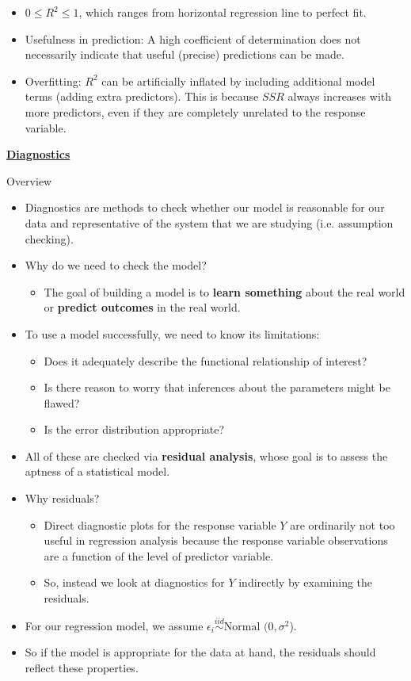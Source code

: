 \documentclass{article}
\newcommand{\bu}[1]{\textbf{\ul{#1}}}				%
\newcommand{\followsp}[2]{\overset{#1}\sim \text{#2}\,}		%
\begin{document}
\begin{itemize}
\begin{itemize}
\begin{itemize}
            \item $0 \le R^2 \le 1$, which ranges from horizontal regression line to perfect fit.
            \item Usefulness in prediction: A high coefficient of determination does not necessarily indicate that useful (precise) predictions can be made.
            \item Overfitting: $R^2$ can be artificially inflated by including additional model terms (adding extra predictors). This is because $SSR$ always increases with more predictors, even if they are completely unrelated to the response variable.
        \end{itemize}
    \end{itemize}
\end{itemize}\bigskip

\bu{Diagnostics}\bigskip

Overview\bigskip
\begin{itemize}
    \item Diagnostics are methods to check whether our model is reasonable for our data and representative of the system that we are studying (i.e. assumption checking).
    \item Why do we need to check the model?
    \begin{itemize}
        \item The goal of building a model is to \textbf{learn something} about the real world or \textbf{predict outcomes} in the real world.
    \end{itemize}
    \item To use a model successfully, we need to know its limitations:
    \begin{itemize}
        \item Does it adequately describe the functional relationship of interest?
        \item Is there reason to worry that inferences about the parameters might be flawed?
        \item Is the error distribution appropriate?
    \end{itemize}
    \item All of these are checked via \textbf{residual analysis}, whose goal is to assess the aptness of a statistical model.
    \item Why residuals? 
    \begin{itemize}
        \item Direct diagnostic plots for the response variable $Y$ are ordinarily not too useful in regression analysis because the response variable observations are a function of the level of predictor variable.
        \item So, instead we look at diagnostics for $Y$ indirectly by examining the residuals.
    \end{itemize}
    \item For our regression model, we assume $\epsilon_i \followsp{iid}{Normal}\,(0, \sigma^2$).
    \item[] So if the model is appropriate for the data at hand, the residuals should reflect these properties.
\end{itemize}\bigskip
\end{document}
